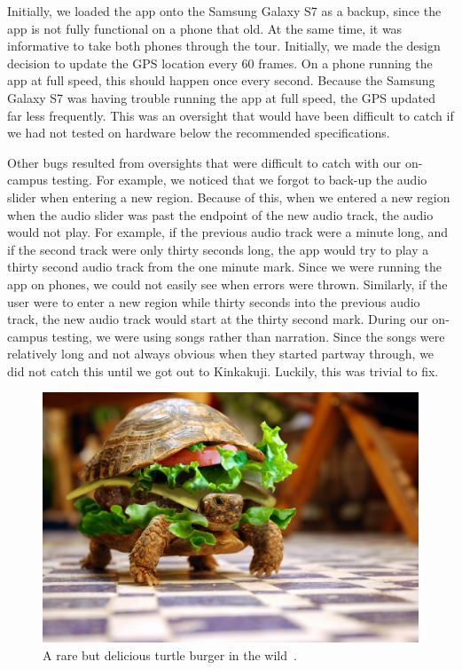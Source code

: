 \documentclass[a4paper, 10pt, american, titlepage]{article}
\begin{document}
Initially, we loaded the app onto the Samsung Galaxy S7 as a backup, since the
app is not fully functional on a phone that old. At the same time, it was
informative to take both phones through the tour. Initially, we made the design
decision to update the GPS location every 60 frames. On a phone running the app
at full speed, this should happen once every second. Because the Samsung Galaxy
S7 was having trouble running the app at full speed, the GPS updated far less
frequently. This was an oversight that would have been difficult to catch if we
had not tested on hardware below the recommended specifications.

Other bugs resulted from oversights that were difficult to catch with our
on-campus testing.  For example, we noticed that we forgot to back-up the audio
slider when entering a new region.  Because of this, when we entered a new
region when the audio slider was past the endpoint of the new audio track, the
audio would not play. For example, if the previous audio track were a minute
long, and if the second track were only thirty seconds long, the app would try
to play a thirty second audio track from the one minute mark. Since we were
running the app on phones, we could not easily see when errors were thrown.
Similarly, if the user were to enter a new region while thirty seconds into the
previous audio track, the new audio track would start at the thirty second
mark. During our on-campus testing, we were using songs rather than narration.
Since the songs were relatively long and not always obvious when they started
partway through, we did not catch this until we got out to Kinkakuji.  Luckily,
this was trivial to fix.

\begin{figure}[h]
	\centering
	\includegraphics[width=\textwidth]{turtle-burger.jpg}
	\caption[A rare but delicious turtle burger in the wild]{A rare but
		delicious turtle burger in the wild~\autocite{harvey2002}.}
	\label{fig:turtleBurger}
\end{figure}
\end{document}
